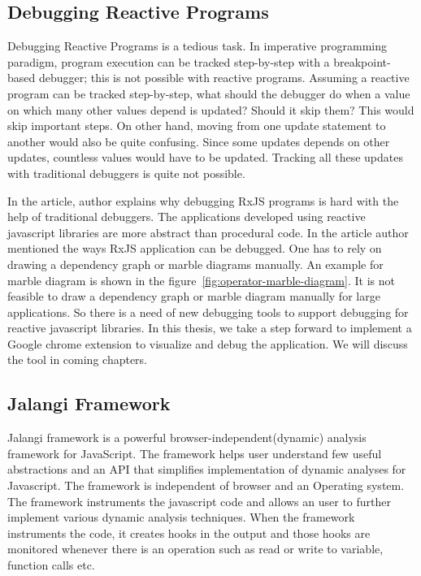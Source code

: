 \subsection{Debugging Reactive Programs}
Debugging Reactive Programs is a tedious task. In imperative programming paradigm, program execution can be tracked step-by-step with a breakpoint-based debugger; this is not possible with reactive programs. Assuming a reactive program can be tracked step-by-step, what should the debugger do when a value on which many other values depend is updated? Should it skip them? This would skip important steps. On other hand, moving from one update statement to another would also be quite confusing. Since some updates depends on other updates, countless values would have to be updated. Tracking all these updates with traditional debuggers is quite not possible.

In the article\cite{debugRxJS}, author explains why debugging RxJS programs is hard with the help of traditional debuggers. The applications developed using reactive javascript libraries are more abstract than procedural code. In the article author mentioned the ways RxJS application can be debugged. One has to rely on drawing a dependency graph or marble diagrams manually. An example for marble diagram is shown in the figure~\ref{fig:operator-marble-diagram}. It is not feasible to draw a dependency graph or marble diagram manually for large applications. So there is a need of new debugging tools to support debugging for reactive javascript libraries. In this thesis, we take a step forward to implement a Google chrome extension to visualize and debug the application. We will discuss the tool in coming chapters.

\subsection{Jalangi Framework}
Jalangi framework\cite{Sen:2013:JSR:2491411.2491447} is a powerful	browser-independent(dynamic) analysis framework for JavaScript. The framework helps user understand few useful abstractions and an API that simplifies implementation of dynamic analyses for Javascript. The framework is independent of browser and an Operating system. The framework instruments the javascript code and allows an user to further implement various dynamic analysis techniques. When the framework instruments the code, it creates hooks in the output and those hooks are monitored whenever there is an operation such as read or write to variable, function calls etc.


